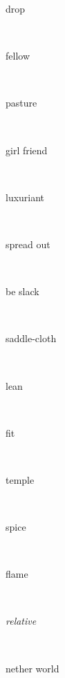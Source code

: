 \documentclass[a4paper]{article}
\begin{document}
\begin{multicols}{4}
\begin{multicols}{4}
\begin{multicols}{5}
{\hebrewfont{}} \begin{english}drop\end{english}\\
{\hebrewfont{}} \begin{english}fellow\end{english}\\
{\hebrewfont{}} \begin{english}pasture\end{english}\\
{\hebrewfont{}} \begin{english}girl friend\end{english}\\
{\hebrewfont{}} \begin{english}luxuriant\end{english}\\
{\hebrewfont{}} \begin{english}spread out\end{english}\\
{\hebrewfont{}} \begin{english}be slack\end{english}\\
{\hebrewfont{}} \begin{english}saddle-cloth\end{english}\\
{\hebrewfont{}} \begin{english}lean\end{english}\\
{\hebrewfont{}} \begin{english}fit\end{english}\\
{\hebrewfont{}} \begin{english}temple\end{english}\\
{\hebrewfont{}} \begin{english}spice\end{english}\\
{\hebrewfont{}} \begin{english}flame\end{english}\\
{\hebrewfont{}} \begin{english}\textit{relative}\end{english}\\
{\hebrewfont{}} \begin{english}nether world\end{english}\\

\end{multicols}
\end{multicols}
\end{multicols}
\end{document}
